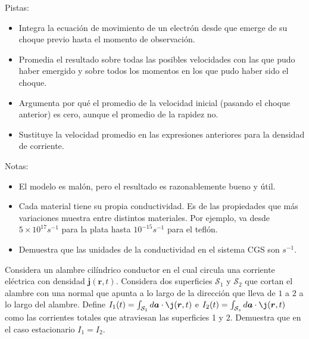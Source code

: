 \documentclass{exam}
\begin{document}
\begin{questions}
    Pistas:
    \begin{itemize}
    \item Integra la ecuación de movimiento de un electrón desde que
      emerge de su choque previo hasta el momento de observación.
    \item Promedia el resultado sobre todas las posibles velocidades
      con las que pudo haber emergido y sobre todos los momentos en
      los que pudo haber sido el choque.
    \item Argumenta por qué el promedio de la velocidad inicial
      (pasando el choque anterior) es cero, aunque el promedio de la
      rapidez no.
    \item Sustituye la velocidad promedio en las expresiones
      anteriores para la densidad de corriente.
    \end{itemize}
    Notas:
    \begin{itemize}
    \item El modelo es malón, pero el resultado es razonablemente
      bueno y útil.
    \item Cada material tiene su propia conductividad. Es de las propiedades
      que más variaciones muestra entre distintos materiales. Por
      ejemplo, va desde $5\times 10^{17}s^{-1}$ para la plata hasta
      $10^{-15}s^{-1}$ para el teflón.
    \item  Demuestra que las unidades de la conductividad en el
      sistema CGS son $s^{-1}$.
    \end{itemize}
  \question Considera un alambre cilíndrico conductor en el cual circula una corriente
    eléctrica con densidad $\bm j(\bm r,t)$. Considera dos superficies
    $\mathcal S_1$ y $\mathcal S_2$ que cortan el alambre con una
    normal que apunta a lo largo de la dirección que lleva de
    $1$ a $2$ a lo largo del alambre. Define
    $I_1(t)=\int_{\mathcal S_1}d\bm a\cdot\j(\bm r,t)$ e
    $I_2(t)=\int_{\mathcal S_s}d\bm a\cdot\j(\bm r,t)$ como las
    corrientes totales que atraviesan las superficies 1 y 2. Demuestra
    que en el caso estacionario $I_1=I_2$.


\end{questions}
\end{document}
